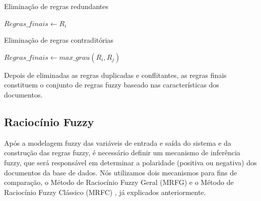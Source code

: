 \documentclass[template.tex]{subfiles}
\begin{document}
\begin{algorithm}
\begin{algorithmic}[1]
\caption{Eliminação de regras redundantes}
\label{alg-regras-repetidas}
           \STATE $Regras\_finais \leftarrow R_i$
       \ENDIF    
   \ENDFOR
\ENDFOR
\end{algorithmic}
\end{algorithm}

\begin{algorithm}
\begin{algorithmic}[1]
\caption{Eliminação de regras contraditórias}
\label{alg-regras-contraditorias}
           \STATE $Regras\_finais \leftarrow max\_grau(R_i,R_j)$
       \ENDIF    
   \ENDFOR
\ENDFOR
\end{algorithmic}
\end{algorithm}


%

Depois de eliminadas as regras duplicadas e conflitantes, as regras finais constituem o conjunto de regras fuzzy baseado nas características dos documentos.

\subsection{Raciocínio Fuzzy}

Após a modelagem fuzzy das variáveis de entrada e saída do sistema e da construção das regras fuzzy, é necessário definir um mecanismo de inferência fuzzy, que será responsável em determinar a polaridade (positiva ou negativa) dos documentos da base de dados. Nós utilizamos dois mecanismos para fins de comparação, o Método de Raciocínio Fuzzy Geral (MRFG) e o Método de Raciocínio Fuzzy Clássico (MRFC) \cite{cordon1999proposal}, já explicados anteriormente.
\end{document}
